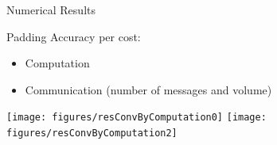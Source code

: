 \documentclass[18pt,xcolor=table]{beamer}
\begin{document}
%
%
%
%
%
%
%
%

\begin{frame}{Numerical Results}
\begin{block}{Padding}
Accuracy per cost:
\begin{itemize}
   \item Computation
   \item Communication (number of messages and volume)
\end{itemize}
\end{block}

\centering
\vspace{0.5 cm}
\texttt{[image: figures/resConvByComputation0]}
\texttt{[image: figures/resConvByComputation2]}

\end{frame}
\end{document}
